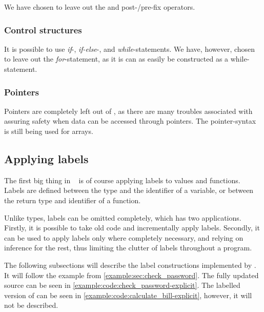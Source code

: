 We have chosen to leave out the \tk{++} and \tk{-{}-} post-/pre-fix operators.

\subsubsection{Control structures}
It is possible to use \emph{if}-, \emph{if-else}-, and \emph{while}-statements.
We have, however, chosen to leave out the \emph{for}-statement, as it is can as easily be constructed as a while-statement.

\subsubsection{Pointers}
Pointers are completely left out of \thelang, as there are many troubles associated with assuring safety when data can be accessed through pointers.
The pointer-syntax is still being used for arrays.

\subsection{Applying labels}
The first big thing in \thelang~ is of course applying labels to values and functions.
Labels are defined between the type and the identifier of a variable, or between the return type and identifier of a function.

Unlike types, labels can be omitted completely, which has two applications.
Firstly, it is possible to take old code and incrementally apply labels.
Secondly, it can be used to apply labels only where completely necessary, and relying on inference for the rest, thus limiting the clutter of labels throughout a program.

The following subsections will describe the label constructions implemented by \thelang.
It will follow the  example from \cref{example:sec:check_password}.
The fully updated source can be seen in \cref{example:code:check_password-explicit}.
The labelled version of  can be seen in \cref{example:code:calculate_bill-explicit}, however, it will not be described.




